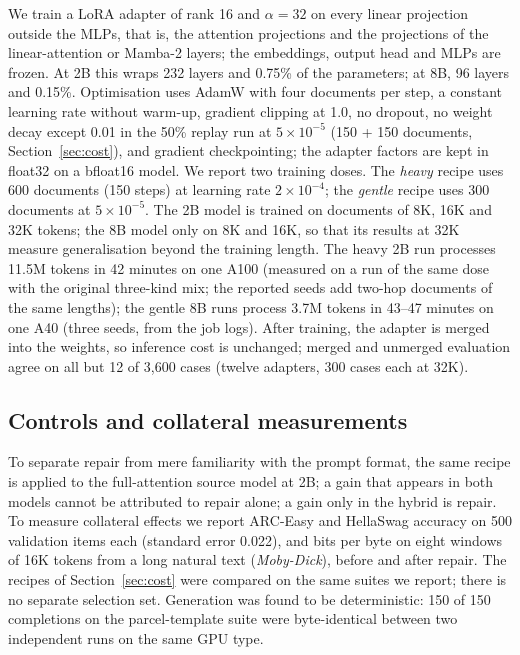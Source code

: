 \documentclass[11pt]{article}
\begin{document}
We train a LoRA adapter \citep{lora2021} of rank 16 and $\alpha = 32$ on every linear projection outside the MLPs, that is, the attention projections and the projections of the linear-attention or Mamba-2 layers; the embeddings, output head and MLPs are frozen. At 2B this wraps 232 layers and 0.75\% of the parameters; at 8B, 96 layers and 0.15\%. Optimisation uses AdamW with four documents per step, a constant learning rate without warm-up, gradient clipping at 1.0, no dropout, no weight decay except 0.01 in the 50\% replay run at $5\times10^{-5}$ (150 + 150 documents, Section~\ref{sec:cost}), and gradient checkpointing; the adapter factors are kept in float32 on a bfloat16 model. We report two training doses. The \emph{heavy} recipe uses 600 documents (150 steps) at learning rate $2\times10^{-4}$; the \emph{gentle} recipe uses 300 documents at $5\times10^{-5}$. The 2B model is trained on documents of 8K, 16K and 32K tokens; the 8B model only on 8K and 16K, so that its results at 32K measure generalisation beyond the training length. The heavy 2B run processes 11.5M tokens in 42 minutes on one A100 (measured on a run of the same dose with the original three-kind mix; the reported seeds add two-hop documents of the same lengths); the gentle 8B runs process 3.7M tokens in 43--47 minutes on one A40 (three seeds, from the job logs). After training, the adapter is merged into the weights, so inference cost is unchanged; merged and unmerged evaluation agree on all but 12 of 3,600 cases (twelve adapters, 300 cases each at 32K).

\subsection{Controls and collateral measurements}
To separate repair from mere familiarity with the prompt format, the same recipe is applied to the full-attention source model at 2B; a gain that appears in both models cannot be attributed to repair alone; a gain only in the hybrid is repair. To measure collateral effects we report ARC-Easy and HellaSwag accuracy on 500 validation items each (standard error 0.022), and bits per byte on eight windows of 16K tokens from a long natural text (\emph{Moby-Dick}), before and after repair. The recipes of Section~\ref{sec:cost} were compared on the same suites we report; there is no separate selection set. Generation was found to be deterministic: 150 of 150 completions on the parcel-template suite were byte-identical between two independent runs on the same GPU type.
\end{document}

